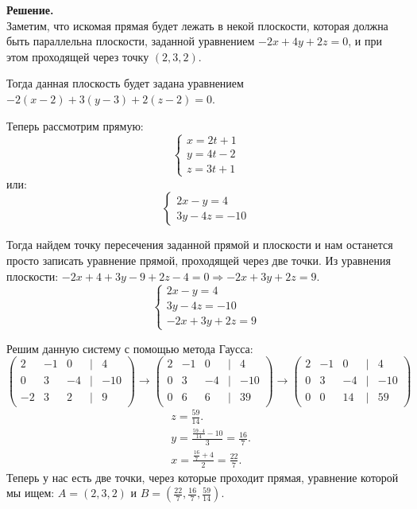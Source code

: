 	\textbf{Решение.}\\
	Заметим, что искомая прямая будет лежать в некой плоскости, которая должна быть параллельна плоскости, заданной уравнением $-2x+4y+2z=0$, и при этом проходящей через точку $(2,3,2)$.
	
	Тогда данная плоскость будет задана уравнением $-2(x - 2) + 3(y - 3) + 2(z - 2) = 0$. 
	
	Теперь рассмотрим прямую:
	\[
		\begin{cases}
			x = 2t + 1 \\
			y = 4t - 2 \\
			z = 3t + 1
		\end{cases}
	\]
	или:
	\[
		\begin{cases}
			2x - y = 4 \\
			3y - 4z = -10 
		\end{cases}
	\]
	
	Тогда найдем точку пересечения заданной прямой и плоскости и нам останется просто записать уравнение прямой, проходящей через две точки. Из уравнения плоскости: $-2x + 4 + 3y - 9 + 2z - 4 = 0 \Rightarrow -2x + 3y + 2z = 9$.
	\[
		\begin{cases}
			2x - y = 4 \\
			3y - 4z = -10 \\
			-2x + 3y + 2z = 9
		\end{cases}
	\]
	
	Решим данную систему с помощью метода Гаусса: 
	\[
		\begin{pmatrix} 
			2 & -1 & 0 & | & 4 \\
			0 & 3 & -4 & | & -10 \\
			-2 & 3 & 2 & | & 9 
		\end{pmatrix} \rightarrow
		\begin{pmatrix} 
		2 & -1 & 0 & | & 4 \\
		0 & 3 & -4 & | & -10 \\
		0 & 6 & 6 & | & 39 
		\end{pmatrix} \rightarrow
		\begin{pmatrix} 
		2 & -1 & 0 & | & 4 \\
		0 & 3 & -4 & | & -10 \\
		0 & 0 & 14 & | & 59 
		\end{pmatrix} 
	\]
	\begin{align*}
		&z = \frac{59}{14}. \\
		&y = \frac{\frac{59 \cdot 4}{14} - 10}{3} = \frac{16}{7}. \\
		&x = \frac{\frac{16}{7} + 4}{2} = \frac{22}{7}.
	\end{align*} 
	Теперь у нас есть две точки, через которые проходит прямая, уравнение которой мы ищем: $A=(2,3,2)$ и $B=(\frac{22}{7}, \frac{16}{7}, \frac{59}{14})$.
	
